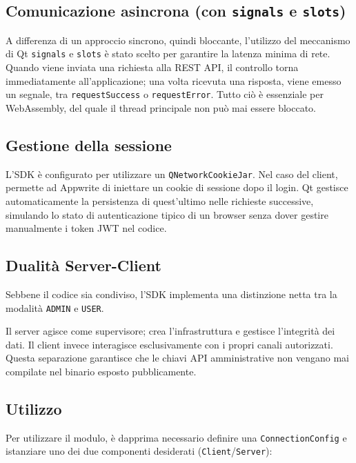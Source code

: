 \documentclass[a4paper, 11pt, twoside]{report}
\begin{document}
\subsection{Comunicazione asincrona (con \texttt{signals} e \texttt{slots})}

A differenza di un approccio sincrono, quindi bloccante, l'utilizzo del meccanismo di Qt \texttt{signals} e \texttt{slots}
è stato scelto per garantire la latenza minima di rete. Quando viene inviata una richiesta alla \gls{REST} API, il controllo
torna immediatamente all'applicazione; una volta ricevuta una risposta, viene emesso un segnale, tra \texttt{requestSuccess}
o \texttt{requestError}. Tutto ciò è essenziale per WebAssembly, del quale il thread principale non può mai essere bloccato.

\subsection{Gestione della sessione}

L'\gls{SDK} è configurato per utilizzare un \texttt{QNetworkCookieJar}. Nel caso del client, permette ad Appwrite di iniettare
un cookie di sessione dopo il login. Qt gestisce automaticamente la persistenza di quest'ultimo nelle richieste
successive, simulando lo stato di autenticazione tipico di un browser senza dover gestire manualmente i token \gls{JWT} nel
codice.

\subsection{Dualità Server-Client}

Sebbene il codice sia condiviso, l'\gls{SDK} implementa una distinzione netta tra la modalità \texttt{ADMIN} e \texttt{USER}.

Il server agisce come supervisore; crea l'infrastruttura e gestisce l'integrità dei dati. Il client invece interagisce
esclusivamente con i propri canali autorizzati. Questa separazione garantisce che le chiavi API amministrative non
vengano mai compilate nel binario esposto pubblicamente.

\subsection{Utilizzo}

Per utilizzare il modulo, è dapprima necessario definire una \texttt{ConnectionConfig} e istanziare uno dei due
componenti desiderati (\texttt{Client}/\texttt{Server}):
\end{document}
